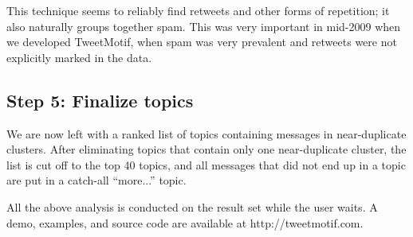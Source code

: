 \documentclass[letterpaper]{article}
\begin{document}
This technique seems to reliably find retweets and other forms of repetition; it also naturally groups together spam.  This was very important in mid-2009 when we developed TweetMotif, when spam was very prevalent and retweets were not explicitly marked in the data.

\subsection{Step 5: Finalize topics}

We are now left with a ranked list of topics containing messages in near-duplicate clusters.  After eliminating topics that contain only one near-duplicate cluster, the list is cut off to the top 40 topics, and all messages that did not end up in a topic are put in a catch-all ``more...'' topic.

All the above analysis is conducted on the result set while the user waits.  A demo, examples, and source code are available at http://tweetmotif.com.






\end{document}
